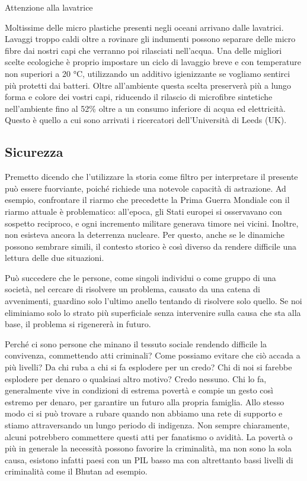 \documentclass[12pt]{book} %
\begin{document}
\bigskip
\begin{mdframed}[linewidth=1pt]
Attenzione alla lavatrice

Moltissime delle micro plastiche presenti negli oceani arrivano dalle lavatrici. Lavaggi troppo caldi oltre a rovinare
gli indumenti possono separare delle micro fibre dai nostri capi che verranno poi rilasciati
nell'acqua. Una delle migliori scelte ecologiche è proprio impostare un ciclo di lavaggio breve e
con temperature non superiori a 20 °C, utilizzando un additivo igienizzante se vogliamo sentirci più protetti dai
batteri. Oltre all'ambiente questa scelta preserverà più a lungo forma e colore dei vostri capi,
riducendo il rilascio di microfibre sintetiche nell'ambiente fino al 52\% oltre a un consumo inferiore di acqua ed
elettricità. Questo è quello a cui sono arrivati i ricercatori dell'Università di Leeds
(UK).
\end{mdframed}

\subsection{Sicurezza}
Premetto dicendo che l'utilizzare la storia come filtro per interpretare il presente può essere fuorviante, poiché richiede una notevole capacità di astrazione. Ad esempio, confrontare il riarmo che precedette la Prima Guerra Mondiale con il riarmo attuale è problematico: all’epoca, gli Stati europei si osservavano con sospetto reciproco, e ogni incremento militare generava timore nei vicini. Inoltre, non esisteva ancora la deterrenza nucleare. Per questo, anche se le dinamiche possono sembrare simili, il contesto storico è così diverso da rendere difficile una lettura delle due situazioni. 

Può succedere che le persone, come singoli individui o come gruppo di una società, nel cercare
di risolvere un problema, causato da una catena di avvenimenti, guardino solo l'ultimo anello
tentando di risolvere solo quello. Se noi eliminiamo solo lo strato più superficiale senza intervenire sulla
causa che sta alla base, il problema si rigenererà in futuro.

Perché ci sono persone che minano il tessuto sociale rendendo difficile la convivenza, commettendo atti criminali?
Come possiamo evitare che ciò accada a più livelli? Da chi ruba a chi si fa esplodere per un credo?
Chi di noi si farebbe esplodere per denaro o qualsiasi altro motivo? Credo nessuno.
Chi lo fa, generalmente vive in condizioni di estrema povertà e compie un gesto così estremo per denaro, per garantire un futuro alla propria famiglia.
Allo stesso modo ci si può trovare a rubare quando non abbiamo una rete di supporto e stiamo attraversando un lungo periodo di indigenza.
Non sempre chiaramente, alcuni potrebbero commettere questi atti per fanatismo o avidità.
La povertà o più in generale la necessità possono favorire la criminalità, ma non sono la sola causa, esistono infatti paesi con un PIL basso ma con altrettanto bassi livelli di criminalità come il Bhutan ad esempio.
\end{document}
